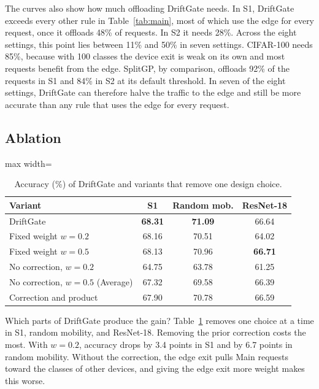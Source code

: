 The curves also show how much offloading DriftGate needs. In S1, DriftGate exceeds every other rule in Table~\ref{tab:main}, most of which use the edge for every request, once it offloads 48\% of requests. In S2 it needs 28\%. Across the eight settings, this point lies between 11\% and 50\% in seven settings. CIFAR-100 needs 85\%, because with 100 classes the device exit is weak on its own and most requests benefit from the edge. SplitGP, by comparison, offloads 92\% of the requests in S1 and 84\% in S2 at its default threshold. In seven of the eight settings, DriftGate can therefore halve the traffic to the edge and still be more accurate than any rule that uses the edge for every request.

\subsection{Ablation}
\label{sec:ablation}

\begin{table}[t]
\centering
\caption{Accuracy (\%) of DriftGate and variants that remove one design choice.}
\label{tab:ablation}
\begin{adjustbox}{max width=\columnwidth}
\begin{tabular}{lccc}
\toprule
Variant & S1 & Random mob. & ResNet-18 \\
\midrule
DriftGate & \textbf{68.31} & \textbf{71.09} & 66.64 \\
Fixed weight $w=0.2$ & 68.16 & 70.51 & 64.02 \\
Fixed weight $w=0.5$ & 68.13 & 70.96 & \textbf{66.71} \\
No correction, $w=0.2$ & 64.75 & 63.78 & 61.25 \\
No correction, $w=0.5$ (Average) & 67.32 & 69.58 & 66.39 \\
Correction and product & 67.90 & 70.78 & 66.59 \\
\bottomrule
\end{tabular}
\end{adjustbox}
\end{table}

Which parts of DriftGate produce the gain? Table~\ref{tab:ablation} removes one choice at a time in S1, random mobility, and ResNet-18. Removing the prior correction costs the most. With $w=0.2$, accuracy drops by 3.4 points in S1 and by 6.7 points in random mobility. Without the correction, the edge exit pulls Main requests toward the classes of other devices, and giving the edge exit more weight makes this worse.

